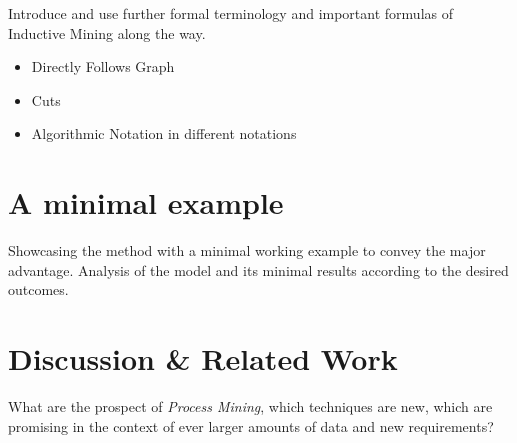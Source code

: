 \documentclass[a4paper]{IEEEtran}
\begin{document}
Introduce and use further formal terminology and important formulas of Inductive Mining along the way. 
\begin{itemize}
    \item Directly Follows Graph
    \item Cuts 
    \item Algorithmic Notation in different notations
\end{itemize}

\section{A minimal example}
\label{sec:example}
Showcasing the method with a minimal working example to convey the major advantage. Analysis of the model and its minimal results according to the desired outcomes. 


\section{Discussion \& Related Work}
What are the prospect of \textit{Process Mining}, which techniques are new, which are promising in the context of ever larger amounts of data and new requirements?



\end{document}
